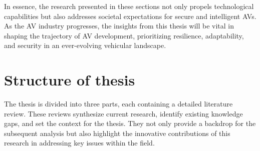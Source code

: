In essence, the research presented in these sections not only propels technological capabilities but also addresses societal expectations for secure and intelligent AVs. As the AV industry progresses, the insights from this thesis will be vital in shaping the trajectory of AV development, prioritizing resilience, adaptability, and security in an ever-evolving vehicular landscape.










\section{Structure of thesis }

The thesis is divided into three parts, each containing a detailed literature review. These reviews synthesize current research, identify existing knowledge gaps, and set the context for the thesis. They not only provide a backdrop for the subsequent analysis but also highlight the innovative contributions of this research in addressing key issues within the field. \newline

